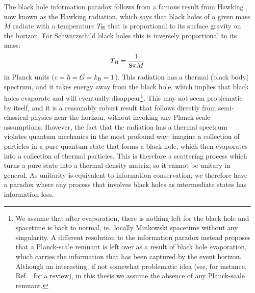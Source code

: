 \documentclass{brownthesis}
\begin{document}
The black hole information paradox follows from a famous result from Hawking \cite{PhysRevD.14.2460},
now known as the Hawking radiation, which says that black holes of a given mass $M$ radiate with
a temperature $T_{\rm H}$ that is proportional to its surface gravity on the horizon. For
Schwarzschild black holes this is inversely proportional to its mass:
\[
T_{\rm H} = \frac{1}{8\pi M}
\]
in Planck units ($c=\hbar = G = k_{\rm B} = 1$). This radiation has a thermal (black body)
spectrum, and it takes energy away from the black hole, which implies that black holes
evaporate and will eventually disappear\footnote{We assume that after evaporation, there is nothing left for the black hole
and spacetime is back to normal, ie.~locally Minkowski spacetime without any singularity.
A different resolution to the information paradox instead proposes that a Planck-scale
remnant is left over as a result of black hole evaporation, which carries the information that has
been captured by the event horizon. Although an interesting, if not somewhat problematic idea
(see, for instance, Ref.~\cite{Chen:2014jwq} for a review), in this thesis we assume the
absence of any Planck-scale remnant.}. This may not seem problematic by itself, and it is a reasonably robust result
that follows directly from semi-classical physics near the horizon, without invoking any
Planck-scale assumptions. However, the fact that the radiation has a thermal spectrum
violates quantum mechanics in the most profound way: imagine a collection of particles
in a pure quantum state that forms a black hole, which then evaporates into a collection
of thermal particles. This is therefore a scattering process which turns
a pure state into a thermal density matrix, so it cannot be unitary in general. As unitarity
is equivalent to information conservation, we therefore have a paradox where any process
that involves black holes as intermediate states has information loss.
\end{document}
